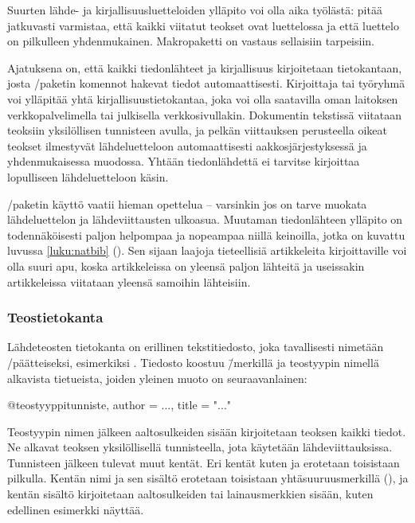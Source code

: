 Suurten lähde- ja kirjallisuusluetteloiden ylläpito voi olla aika
työlästä: pitää jatkuvasti varmistaa, että kaikki viitatut teokset ovat
luettelossa ja että luettelo on pilkulleen yhdenmukainen. Makropaketti
 on vastaus sellaisiin tarpeisiin.

Ajatuksena on, että kaikki tiedonlähteet ja kirjallisuus kirjoitetaan
tietokantaan, josta \-/paketin komennot hakevat tiedot
automaattisesti. Kirjoittaja tai työryhmä voi ylläpitää yhtä
kirjallisuustietokantaa, joka voi olla saatavilla oman laitoksen
verkkopalvelimella tai julkisella verkkosivullakin. Dokumentin tekstissä
viitataan teoksiin yksilöllisen tunnisteen avulla, ja pelkän viittauksen
perusteella oikeat teokset ilmestyvät lähdeluetteloon automaattisesti
aakkosjärjestyksessä ja yhdenmukaisessa muodossa. Yhtään tiedonlähdettä
ei tarvitse kirjoittaa lopulliseen lähdeluetteloon käsin.

\-/paketin käyttö vaatii hieman opettelua -- varsinkin
jos on tarve muokata lähdeluettelon ja lähdeviittausten ulkoasua.
Muutaman tiedonlähteen ylläpito on todennäköisesti paljon helpompaa ja
nopeampaa niillä keinoilla, jotka on kuvattu luvussa \ref{luku:natbib}
(). Sen sijaan laajoja tieteellisiä artikkeleita
kirjoittaville  voi olla suuri apu, koska
artikkeleissa on yleensä paljon lähteitä ja useissakin artikkeleissa
viitataan yleensä samoihin lähteisiin.

\subsubsection{Teostietokanta}

Lähdeteosten tietokanta on erillinen tekstitiedosto, joka tavallisesti
nimetään \-/päätteiseksi, esimerkiksi .
Tiedosto koostuu \=/merkillä ja teostyypin nimellä alkavista
tietueista, joiden yleinen muoto on seuraavanlainen:

\begin{koodilohkosis}
  @teostyyppi{tunniste,
    author = {...},
    title = "..."
  }
\end{koodilohkosis}

Teostyypin nimen jälkeen aaltosulkeiden sisään kirjoitetaan teoksen
kaikki tiedot. Ne alkavat teoksen yksilöllisellä tunnisteella, jota
käytetään lähdeviittauksissa. Tunnisteen jälkeen tulevat muut kentät.
Eri kentät kuten  ja  erotetaan toisistaan
pilkulla. Kentän nimi ja sen sisältö erotetaan toisistaan
yhtäsuuruusmerkillä (\koodi{=}), ja kentän sisältö kirjoitetaan
aaltosulkeiden tai lainausmerkkien sisään, kuten edellinen esimerkki
näyttää.

